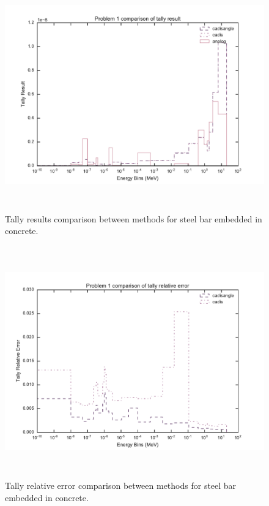 \begin{figure}[h!]
  \centering
  \includegraphics[height=10cm]{./chapters/characterization_probs/figures/char/prob_1/problem_1_tally_result_compare.pdf}
  \caption[Tally results comparison between methods for steel bar embedded in
  concrete.]
  {Tally results comparison between methods for steel bar embedded in concrete.}
  \label{fig:steelbeamresult}
\end{figure}

\begin{figure}[h!]
  \centering
  \includegraphics[height=10cm]{./chapters/characterization_probs/figures/char/prob_1/problem_1_tally_error_compare.pdf}
  \caption[Tally relative error comparison between methods for steel bar
  embedded in concrete.]
  {Tally relative error comparison between methods for steel bar embedded in
  concrete.}
  \label{fig:steelbeamerror}
\end{figure}

